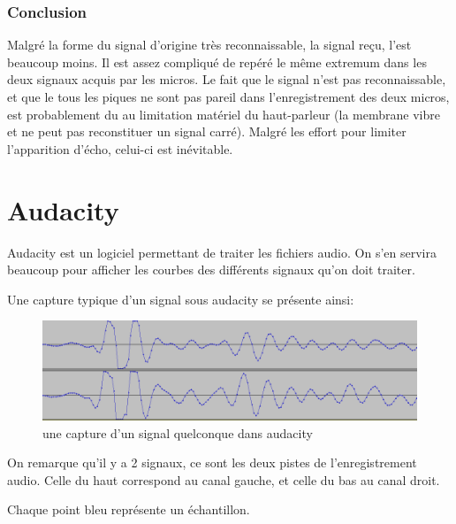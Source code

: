 \documentclass[12pt,a4paper]{report}
\begin{document}
\subsection{Conclusion}
Malgré la forme du signal d'origine très reconnaissable, la signal reçu, l'est beaucoup moins. Il est assez compliqué de repéré le même extremum dans les deux signaux acquis par les micros. Le fait que le signal n'est pas reconnaissable, et que le tous les piques ne sont pas pareil dans l'enregistrement des deux micros, est probablement du au limitation matériel du haut-parleur (la membrane vibre et ne peut pas reconstituer un signal carré). Malgré les effort pour limiter l'apparition d'écho, celui-ci est inévitable.
	
	
\appendix
\chapter{Audacity}
Audacity est un logiciel permettant de traiter les fichiers audio.
On s'en servira beaucoup pour afficher les courbes des différents signaux qu'on doit traiter.

Une capture typique d'un signal sous audacity se présente ainsi:

\begin{figure}[H]
\includegraphics[width=\textwidth]{img/dos_a_dos.png}
\caption{une capture d'un signal quelconque dans audacity}
\end{figure}

On remarque qu'il y a 2 signaux, ce sont les deux pistes de l'enregistrement audio. Celle du haut correspond au canal gauche, et celle du bas au canal droit.

Chaque point bleu représente un échantillon.
\end{document}
